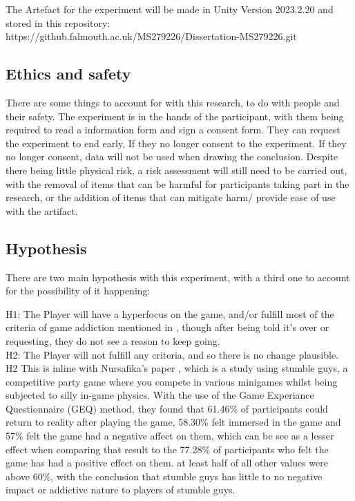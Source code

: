 \documentclass[conference]{IEEEtran}
\begin{document}
The Artefact for the experiment will be made in Unity Version 2023.2.20 \cite{Unity23} and stored in this repository:\\

\hypertarget{https://github.falmouth.ac.uk/MS279226/Dissertation-MS279226.git}{https://github.falmouth.ac.uk/MS279226/Dissertation-MS279226.git}\\

\subsection{Ethics and safety}
There are some things to account for with this research, to do with people and their safety. The experiment is in the hands of the participant, with them being required to read a information form and sign a consent form. They can request the experiment to end early, If they no longer consent to the experiment.  If they no longer consent, data will not be used when drawing the conclusion. Despite there being little physical risk, a risk assessment will still need to be carried out, with the removal of items that can be harmful for participants taking part in the research, or the addition of items that can mitigate harm/ provide ease of use with the artifact.\\

\subsection {Hypothesis}
There are two main hypothesis with this experiment, with a third one to account for the possibility of it happening:

H1: The Player will have a hyperfocus on the game, and/or fulfill most of the criteria of game addiction mentioned in \cite{NHSHamp24}, though after being told it's over or requesting, they do not see a reason to keep going.\\

H2: The Player will not fulfill any criteria, and so there is no change plausible.\\

H2 This is inline with Nursafika's paper \cite{Nursafika2024}, which is a study using stumble guys, a competitive party game where you compete in various minigames whilst being subjected to silly in-game physics. With the use of the Game Experiance Questionnaire (GEQ) method, they found that 61.46\% of participants could return to reality after playing the game, 58.30\% felt immersed in the game and 57\% felt the game had a negative affect on them, which can be see as a lesser effect when comparing that result to the 77.28\% of participants who felt the game has had a positive effect on them. at least half of all other values were above 60\%,  with the conclusion that stumble guys has little to no negative impact or addictive nature to players of stumble guys.\\
\end{document}
